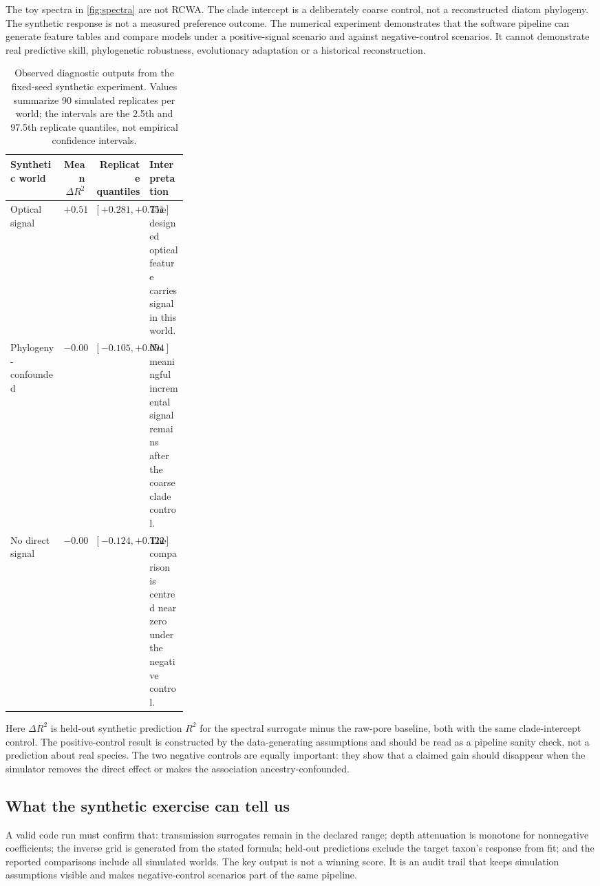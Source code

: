 \documentclass[11pt,a4paper]{article}
\begin{document}
The toy spectra in \cref{fig:spectra} are not RCWA. The clade intercept is a deliberately coarse control, not a reconstructed diatom phylogeny. The synthetic response is not a measured preference outcome. The numerical experiment demonstrates that the software pipeline can generate feature tables and compare models under a positive-signal scenario and against negative-control scenarios. It cannot demonstrate real predictive skill, phylogenetic robustness, evolutionary adaptation or a historical reconstruction.

\begin{table}[H]
\caption{Observed diagnostic outputs from the fixed-seed synthetic experiment. Values summarize 90 simulated replicates per world; the intervals are the 2.5th and 97.5th replicate quantiles, not empirical confidence intervals.}
\label{tab:synthetic-results}
\small\begin{tabularx}{\linewidth}{@{}p{0.30\linewidth}r r X@{}}
\toprule
Synthetic world & Mean $\Delta R^2$ & Replicate quantiles & Interpretation \\
\midrule
Optical signal & $+0.517$ & $[+0.281,+0.751]$ & The designed optical feature carries signal in this world. \\
Phylogeny-confounded & $-0.001$ & $[-0.105,+0.094]$ & No meaningful incremental signal remains after the coarse clade control. \\
No direct signal & $-0.002$ & $[-0.124,+0.122]$ & The comparison is centred near zero under the negative control. \\
\bottomrule\end{tabularx}
\end{table}

Here $\Delta R^2$ is held-out synthetic prediction $R^2$ for the spectral surrogate minus the raw-pore baseline, both with the same clade-intercept control. The positive-control result is constructed by the data-generating assumptions and should be read as a pipeline sanity check, not a prediction about real species. The two negative controls are equally important: they show that a claimed gain should disappear when the simulator removes the direct effect or makes the association ancestry-confounded.

\subsection{What the synthetic exercise can tell us}
A valid code run must confirm that: transmission surrogates remain in the declared range; depth attenuation is monotone for nonnegative coefficients; the inverse grid is generated from the stated formula; held-out predictions exclude the target taxon's response from fit; and the reported comparisons include all simulated worlds. The key output is not a winning score. It is an audit trail that keeps simulation assumptions visible and makes negative-control scenarios part of the same pipeline.
\end{document}
